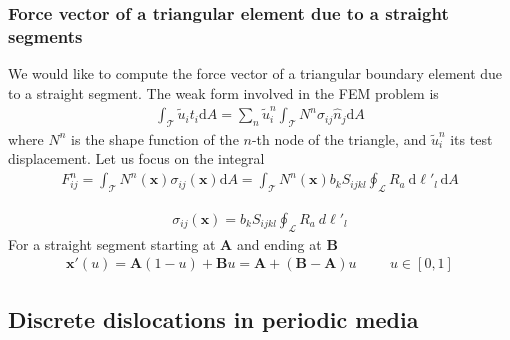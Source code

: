 \subsubsection{Force vector of a triangular element due to a straight segments}
We would like to compute the force vector of a triangular boundary element due to a straight segment. The weak form involved in the FEM problem is
\begin{align}
\int_\mathcal{T}\tilde u_i t_i \text{d}A=\sum_n \tilde u^n_i\int_\mathcal{T}N^n \sigma_{ij}\hat{n}_j \text{d}A
\end{align}
where $N^n$ is the shape function of the $n$-th node of the triangle, and $\tilde u^n_i$ its test displacement. Let us focus on the integral
\begin{align}
F^n_{ij}=\int_\mathcal{T}N^n(\bm x) \sigma_{ij}(\bm x) \text{d}A
=\int_\mathcal{T}N^n(\bm x) b_kS_{ijkl}\oint_\mathcal{L}R_a\ \text{d}\ell'_l\, \text{d}A
\end{align}


\begin{align}
\sigma_{ij}(\bm x)=b_kS_{ijkl}\oint_\mathcal{L}R_a\ d\ell'_l
\end{align}
For a straight segment starting at $\bm A$ and ending at $\bm B$
\begin{align}
\bm x'(u)=\bm A(1-u)+\bm Bu=\bm A+(\bm B-\bm A)u\hspace{1cm} u\in[0,1]
\end{align}


\subsection{Discrete dislocations in periodic media}
